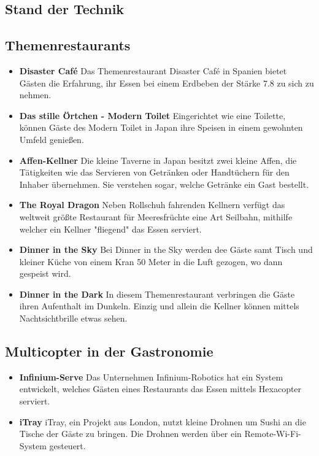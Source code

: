   \subsection{Stand der Technik}
  \subsection*{Themenrestaurants}
  \begin{itemize}
    \item \textbf{Disaster Café}
    Das Themenrestaurant Disaster Café in Spanien bietet Gästen die Erfahrung, ihr Essen bei einem Erdbeben
    der Stärke 7.8 zu sich zu nehmen.

    \item \textbf{Das stille Örtchen - Modern Toilet}
    Eingerichtet wie eine Toilette, können Gäste des Modern Toilet in Japan ihre Speisen in einem gewohnten Umfeld genießen.

    \item \textbf{Affen-Kellner}
    Die kleine Taverne in Japan besitzt zwei kleine Affen, die Tätigkeiten wie das Servieren von Getränken oder Handtüchern
    für den Inhaber übernehmen. Sie verstehen sogar, welche Getränke ein Gast bestellt.

    \item \textbf{The Royal Dragon}
    Neben Rollschuh fahrenden Kellnern verfügt das weltweit größte Restaurant für Meeresfrüchte eine
    Art Seilbahn, mithilfe welcher ein Kellner "fliegend" das Essen serviert.

    \item \textbf{Dinner in the Sky}
    Bei Dinner in the Sky werden dee Gäste samt Tisch und kleiner Küche von einem Kran 50 Meter
    in die Luft gezogen, wo dann gespeist wird.

    \item \textbf{Dinner in the Dark}
    In diesem Themenrestaurant verbringen die Gäste ihren Aufenthalt im Dunkeln. Einzig und allein die
    Kellner können mittels Nachtsichtbrille etwas sehen.
  \end{itemize}

  \subsection*{Multicopter in der Gastronomie}
  \begin{itemize}
      \item \textbf{Infinium-Serve}
      Das Unternehmen Infinium-Robotics hat ein System entwickelt, welches Gästen eines Restaurants
      das Essen mittels Hexacopter serviert.

      \item \textbf{iTray}
      iTray, ein Projekt aus London, nutzt kleine Drohnen um Sushi an die Tische der Gäste zu bringen.
      Die Drohnen werden über ein Remote-Wi-Fi-System gesteuert.

  \end{itemize}

